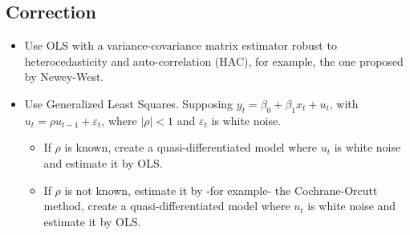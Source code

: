 \documentclass[10pt, a4paper, landscape]{extarticle}
\begin{document}
\begin{multicols}{3}
\subsection*{Correction}

\begin{itemize}[leftmargin=*]
	\item Use OLS with a variance-covariance matrix estimator robust to heterocedasticity and auto-correlation (HAC), for example, the one proposed by Newey-West.
	\item Use Generalized Least Squares. Supposing $y_t = \beta_0 + \beta_1 x_t + u_t$, with $u_t = \rho u_{t - 1} + \varepsilon_t$, where $\lvert \rho \rvert < 1$ and $\varepsilon_t$ is white noise.
	\begin{itemize}[leftmargin=*]
		\item If $\rho$ is known, create a quasi-differentiated model where $u_t$ is white noise and estimate it by OLS.
		\item If $\rho$ is not known, estimate it by -for example- the Cochrane-Orcutt method, create a quasi-differentiated model where $u_t$ is white noise and estimate it by OLS.
	\end{itemize}
\end{itemize}

\end{multicols}
\end{document}
